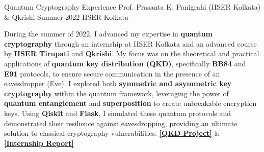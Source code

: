 \cvevent
    {Quantum Cryptography Experience}  %
    {Prof. Prasanta K. Panigrahi (IISER Kolkata) \& Qkrishi}  %
    {Summer 2022}  %
    {IISER Kolkata}  %
    \begin{justify}
        During the summer of 2022, I advanced my expertise in \textbf{quantum cryptography} through an internship at IISER Kolkata and an advanced course by \textbf{IISER Tirupati} and \textbf{Qkrishi}. My focus was on the theoretical and practical applications of \textbf{quantum key distribution (QKD)}, specifically \textbf{BB84} and \textbf{E91} protocols, to ensure secure communication in the presence of an eavesdropper (Eve). I explored both \textbf{symmetric and asymmetric key cryptography} within the quantum framework, leveraging the power of \textbf{quantum entanglement} and \textbf{superposition} to create unbreakable encryption keys. Using \textbf{Qiskit} and \textbf{Flask}, I simulated these quantum protocols and demonstrated their resilience against eavesdropping, providing an ultimate solution to classical cryptography vulnerabilities.  
        \href{https://github.com/PeithonKing/Attacking_QKD_Protocols}{\textbf{[QKD Project]}} \& \href{https://peithonking.github.io/Quantum_Robot_LaTEX/quantum_robot_internship_report.pdf}{\textbf{[Internship Report]}}
    \end{justify}


